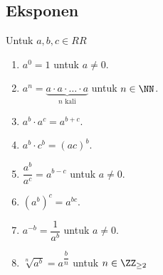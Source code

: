 \subsection{Eksponen}
Untuk $a,b,c \in RR$
\begin{enumerate}
    \item $a^0=1$ untuk $a \neq 0$.
    \item $a^n =  \underbrace{a \cdot a \cdot \ldots \cdot a}_{n \text{ kali}}$ untuk $n \in \NN$.
    \item $a^b\cdot a^c=a^{b+c}$.
    \item $a^b\cdot c^b = (ac)^b$.
    \item $\dfrac{a^b}{a^c}=a^{b-c}$ untuk $a\neq 0$.
    \item $(a^b)^c=a^{bc}$.
    \item $a^{-b} = \dfrac{1}{a^b}$ untuk $a \neq 0$.
    \item $\sqrt[n]{a^b}=a^{\dfrac{b}{n}}$ untuk $n \in \ZZ_{\ge 2}$
\end{enumerate}
